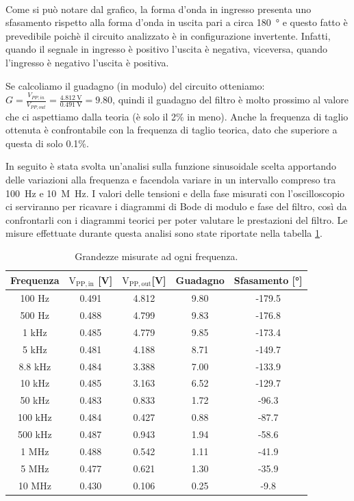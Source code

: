 \documentclass{report}
\begin{document}
\\Come si può notare dal grafico, la forma d'onda in ingresso presenta uno sfasamento rispetto alla forma d'onda in uscita pari a circa \SI{180}{\degree} e questo fatto è prevedibile poichè il circuito analizzato è in configurazione invertente. Infatti, quando il segnale in ingresso è positivo l'uscita è negativa, viceversa, quando l'ingresso è negativo l'uscita è positiva.\par %
Se calcoliamo il guadagno (in modulo) del circuito otteniamo: $\displaystyle{G=\frac{V_{PP,in}}{V_{PP,out}}=\frac{\SI{4.812}{\volt}}{\SI{0.491}{\volt}}=9.80}$, quindi il guadagno del filtro è molto prossimo al valore che ci aspettiamo dalla teoria (è solo il 2\% in meno). Anche la frequenza di taglio ottenuta è confrontabile con la frequenza di taglio teorica, dato che superiore a questa di solo 0.1\%.\par %
In seguito è stata svolta un'analisi sulla funzione sinusoidale scelta apportando delle variazioni alla frequenza e facendola variare in un intervallo compreso tra \SI{100}{\hertz} e \SI{10}{M\hertz}. I valori delle tensioni e della fase misurati con l'oscilloscopio ci serviranno per ricavare i diagrammi di Bode di modulo e fase del filtro, così da confrontarli con i diagrammi teorici per poter valutare le prestazioni del filtro. Le misure effettuate durante questa analisi sono state riportate nella tabella \ref{table:misure}. %
\begin{table}[h!]
	\centering
	\begin{tabular}{|c|c|c|c|c|}
		\hline
		\textbf{Frequenza} &\boldmath$\displaystyle\mathrm{{V_{PP,in}}}$ \textbf{[V]} & \boldmath$\displaystyle\mathrm{{V_{PP,out}}}$\textbf{[V]} & \textbf{Guadagno} & \textbf{Sfasamento [°]}\\
		\hline
		100 Hz & 0.491 & 4.812 & 9.80 & -179.5\\ %
		\hline
		500 Hz & 0.488 & 4.799 & 9.83 & -176.8\\
		\hline
		1 kHz & 0.485 & 4.779 & 9.85 & -173.4\\
		\hline
		5 kHz & 0.481 & 4.188 & 8.71 & -149.7\\
		\hline
		8.8 kHz & 0.484 & 3.388 & 7.00 & -133.9\\
		\hline
		10 kHz & 0.485 & 3.163 & 6.52 & -129.7\\
		\hline
		50 kHz & 0.483 & 0.833 & 1.72 & -96.3\\
		\hline
		100 kHz & 0.484 & 0.427 & 0.88 & -87.7\\
		\hline
		500 kHz & 0.487 & 0.943 & 1.94 & -58.6\\
		\hline
		1 MHz & 0.488 & 0.542 & 1.11 & -41.9\\
		\hline
		5 MHz & 0.477 & 0.621 & 1.30 & -35.9\\
		\hline
		10 MHz & 0.430 & 0.106 & 0.25 & -9.8\\
		\hline\end{tabular}
\caption{Grandezze misurate ad ogni frequenza.}
\label{table:misure}
\end{table}
\end{document}
